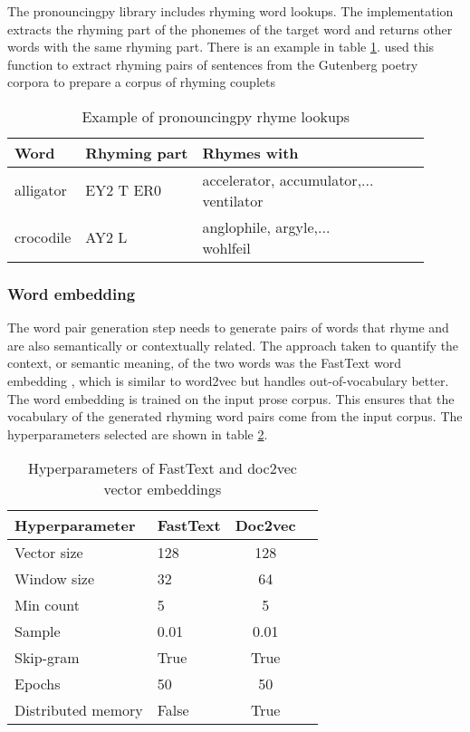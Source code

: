 \documentclass[11pt,a4paper]{article}
\begin{document}
The pronouncingpy library includes rhyming word lookups. The implementation extracts the rhyming part of the phonemes of the target word and returns other words with the same rhyming part. There is an example in table \ref{table:pronouncingrhymes}. \citet{cole} used this function to extract rhyming pairs of sentences from the Gutenberg poetry corpora to prepare a corpus of rhyming couplets

\begin{table}
\centering
\begin{tabular}{lll c c c}
	\hline\hline
	Word & Rhyming part & Rhymes with \\ [0.5ex]
	\hline\hline
	alligator & EY2 T ER0 & \makecell[l]{accelerator, accumulator,...\\ventilator} \\ [0.5ex]
	\hline
	crocodile & AY2 L &  \makecell[l]{anglophile, argyle,...\\wohlfeil} \\ [0.5ex]
	\hline
\end{tabular}
\caption{Example of pronouncingpy rhyme lookups}
\label{table:pronouncingrhymes}
\end{table}

\subsubsection{Word embedding}
\label{sec:fasttext}

The word pair generation step needs to generate pairs of words that rhyme and are also semantically or contextually related. The approach taken to quantify the context, or semantic meaning, of the two words was the FastText word embedding \cite{fasttext}, which is similar to word2vec \cite{wordvec} but handles out-of-vocabulary better. The word embedding is trained on the input prose corpus. This ensures that the vocabulary of the generated rhyming word pairs come from the input corpus. The hyperparameters selected are shown in table \ref{table:HP_fasttext}.

\begin{table}[ht]
\centering
\begin{tabular}{ll c c}
	\hline\hline
	Hyperparameter & FastText & Doc2vec \\ [0.5ex]
	\hline\hline
	Vector size & 128 & 128 \\ [0.5ex]
	Window size & 32 & 64 \\ [0.5ex]
	Min count & 5 & 5 \\ [0.5ex]
	Sample & 0.01 & 0.01 \\ [0.5ex]
	Skip-gram & True & True \\ [0.5ex]
	Epochs & 50 & 50 \\ [0.5ex]
	Distributed memory & False & True \\ [0.5ex]
	\hline
\end{tabular}
\caption{Hyperparameters of FastText and doc2vec vector embeddings}
\label{table:HP_fasttext}
\end{table}
\end{document}
